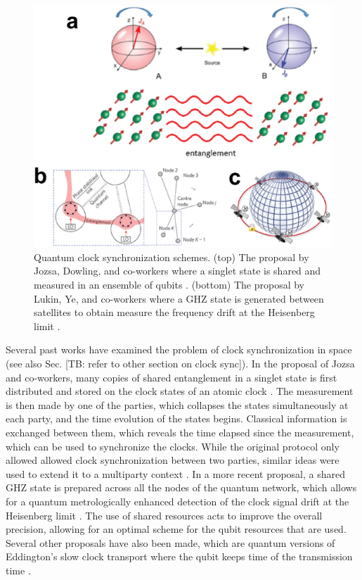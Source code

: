 \documentclass[aps,rmp,reprint,amsmath,amssymb,graphicx,longbibliography]{revtex4-1}
\begin{document}
\begin{figure}
\includegraphics[width=\columnwidth]{figspace3}
\caption{Quantum clock synchronization schemes. (top) The proposal by Jozsa, Dowling, and co-workers where a singlet state is shared and measured in an ensemble of qubits \cite{jozsa00}. (bottom) The proposal by Lukin, Ye, and co-workers where a GHZ state is generated between satellites to obtain measure the frequency drift at the Heisenberg limit \cite{komar14}. }
\label{figspace3}
\end{figure}



Several past works have examined the problem of clock synchronization in space (see also Sec. [TB: refer to other section on clock sync]). In the proposal of Jozsa and co-workers, many copies of shared entanglement in a singlet state is first distributed and stored on the clock states of an atomic clock \cite{jozsa00}.  The measurement is then made by one of the parties, which collapses the states simultaneously at each party, and the time evolution of the states begins. Classical information is exchanged between them, which reveals the time elapsed since the measurement, which can be used to synchronize the clocks. While the original protocol only allowed allowed clock synchronization between two parties, similar ideas were used to extend it to a multiparty context \cite{krvco2002quantum,ben2011optimized,ren2012clock}.  In a more recent proposal, a shared GHZ state is prepared across all the nodes of the quantum network, which allows for a quantum metrologically enhanced detection of the clock signal drift at the Heisenberg limit \cite{komar14}. The use of shared resources acts to improve the overall precision, allowing for an optimal scheme for the qubit resources that are used. Several other proposals have also been made, which are quantum versions of Eddington's slow clock transport where the qubit keeps time of the transmission time \cite{chuang2000quantum,tavakoli2015quantum}. 
\end{document}
